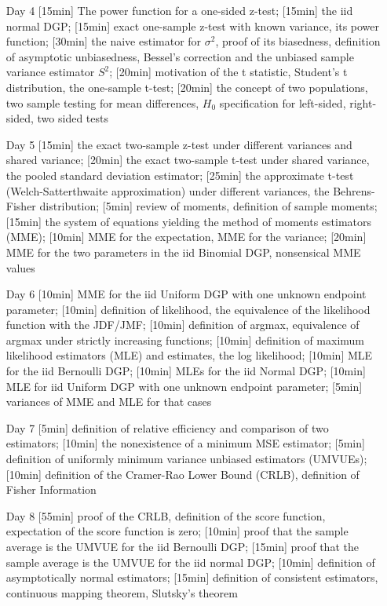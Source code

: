 \begin{enumerate}
\rule{8cm}{0.4pt} 

\item[Day 4] [15min] The power function for a one-sided z-test; [15min] the iid normal DGP; [15min] exact one-sample z-test with known variance, its power function; [30min] the naive estimator for $\sigma^2$, proof of its biasedness, definition of asymptotic unbiasedness, Bessel's correction and the unbiased sample variance estimator $S^2$; [20min] motivation of the t statistic, Student's t distribution, the one-sample t-test; [20min] the concept of two populations, two sample testing for mean differences, $H_0$ specification for left-sided, right-sided, two sided tests

\item[Day 5] [15min] the exact two-sample z-test under different variances and shared variance; [20min] the exact two-sample t-test under shared variance, the pooled standard deviation estimator; [25min] the approximate t-test (Welch-Satterthwaite approximation) under different variances, the Behrens-Fisher distribution; [5min] review of moments, definition of sample moments; [15min] the system of equations yielding the method of moments estimators (MME); [10min] MME for the expectation, MME for the variance; [20min] MME for the two parameters in the iid Binomial DGP, nonsensical MME values

\item[Day 6] [10min] MME for the iid Uniform DGP with one unknown endpoint parameter; [10min] definition of likelihood, the equivalence of the likelihood function with the JDF/JMF; [10min] definition of argmax, equivalence of argmax under strictly increasing functions; [10min] definition of maximum likelihood estimators (MLE) and estimates, the log likelihood; [10min] MLE for the iid Bernoulli DGP; [10min] MLEs for the iid Normal DGP; [10min] MLE for iid Uniform DGP with one unknown endpoint parameter; [5min] variances of MME and MLE for that cases

\item[Day 7] [5min] definition of relative efficiency and comparison of two estimators; [10min] the nonexistence of a minimum MSE estimator; [5min] definition of uniformly minimum variance unbiased estimators (UMVUEs); [10min] definition of the Cramer-Rao Lower Bound (CRLB), definition of Fisher Information

\item[Day 8] [55min] proof of the CRLB, definition of the score function, expectation of the score function is zero; [10min] proof that the sample average is the UMVUE for the iid Bernoulli DGP; [15min] proof that the sample average is the UMVUE for the iid normal DGP; [10min] definition of asymptotically normal estimators; [15min] definition of consistent estimators, continuous mapping theorem, Slutsky's theorem


\end{enumerate}

